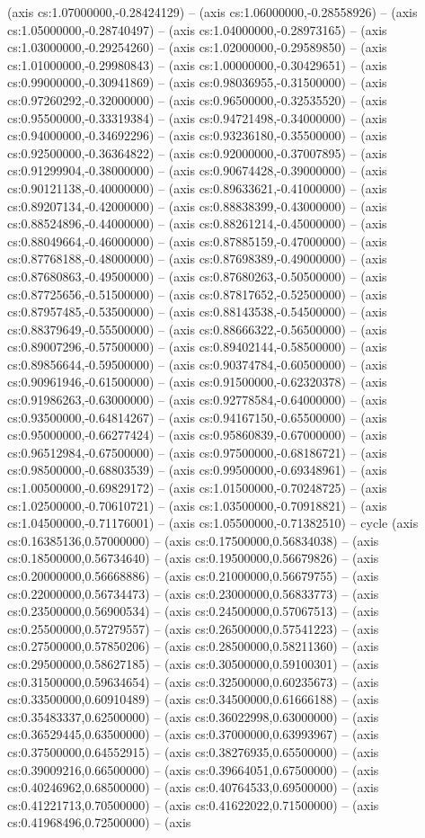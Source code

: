 (axis cs:1.07000000,-0.28424129) -- (axis cs:1.06000000,-0.28558926) -- (axis cs:1.05000000,-0.28740497) -- (axis cs:1.04000000,-0.28973165) -- (axis cs:1.03000000,-0.29254260) -- (axis cs:1.02000000,-0.29589850) -- (axis cs:1.01000000,-0.29980843) -- (axis cs:1.00000000,-0.30429651) -- (axis cs:0.99000000,-0.30941869) -- (axis cs:0.98036955,-0.31500000) -- (axis cs:0.97260292,-0.32000000) -- (axis cs:0.96500000,-0.32535520) -- (axis cs:0.95500000,-0.33319384) -- (axis cs:0.94721498,-0.34000000) -- (axis cs:0.94000000,-0.34692296) -- (axis cs:0.93236180,-0.35500000) -- (axis cs:0.92500000,-0.36364822) -- (axis cs:0.92000000,-0.37007895) -- (axis cs:0.91299904,-0.38000000) -- (axis cs:0.90674428,-0.39000000) -- (axis cs:0.90121138,-0.40000000) -- (axis cs:0.89633621,-0.41000000) -- (axis cs:0.89207134,-0.42000000) -- (axis cs:0.88838399,-0.43000000) -- (axis cs:0.88524896,-0.44000000) -- (axis cs:0.88261214,-0.45000000) -- (axis cs:0.88049664,-0.46000000) -- (axis cs:0.87885159,-0.47000000) -- (axis cs:0.87768188,-0.48000000) -- (axis cs:0.87698389,-0.49000000) -- (axis cs:0.87680863,-0.49500000) -- (axis cs:0.87680263,-0.50500000) -- (axis cs:0.87725656,-0.51500000) -- (axis cs:0.87817652,-0.52500000) -- (axis cs:0.87957485,-0.53500000) -- (axis cs:0.88143538,-0.54500000) -- (axis cs:0.88379649,-0.55500000) -- (axis cs:0.88666322,-0.56500000) -- (axis cs:0.89007296,-0.57500000) -- (axis cs:0.89402144,-0.58500000) -- (axis cs:0.89856644,-0.59500000) -- (axis cs:0.90374784,-0.60500000) -- (axis cs:0.90961946,-0.61500000) -- (axis cs:0.91500000,-0.62320378) -- (axis cs:0.91986263,-0.63000000) -- (axis cs:0.92778584,-0.64000000) -- (axis cs:0.93500000,-0.64814267) -- (axis cs:0.94167150,-0.65500000) -- (axis cs:0.95000000,-0.66277424) -- (axis cs:0.95860839,-0.67000000) -- (axis cs:0.96512984,-0.67500000) -- (axis cs:0.97500000,-0.68186721) -- (axis cs:0.98500000,-0.68803539) -- (axis cs:0.99500000,-0.69348961) -- (axis cs:1.00500000,-0.69829172) -- (axis cs:1.01500000,-0.70248725) -- (axis cs:1.02500000,-0.70610721) -- (axis cs:1.03500000,-0.70918821) -- (axis cs:1.04500000,-0.71176001) -- (axis cs:1.05500000,-0.71382510) -- cycle (axis cs:0.16385136,0.57000000) -- (axis cs:0.17500000,0.56834038) -- (axis cs:0.18500000,0.56734640) -- (axis cs:0.19500000,0.56679826) -- (axis cs:0.20000000,0.56668886) -- (axis cs:0.21000000,0.56679755) -- (axis cs:0.22000000,0.56734473) -- (axis cs:0.23000000,0.56833773) -- (axis cs:0.23500000,0.56900534) -- (axis cs:0.24500000,0.57067513) -- (axis cs:0.25500000,0.57279557) -- (axis cs:0.26500000,0.57541223) -- (axis cs:0.27500000,0.57850206) -- (axis cs:0.28500000,0.58211360) -- (axis cs:0.29500000,0.58627185) -- (axis cs:0.30500000,0.59100301) -- (axis cs:0.31500000,0.59634654) -- (axis cs:0.32500000,0.60235673) -- (axis cs:0.33500000,0.60910489) -- (axis cs:0.34500000,0.61666188) -- (axis cs:0.35483337,0.62500000) -- (axis cs:0.36022998,0.63000000) -- (axis cs:0.36529445,0.63500000) -- (axis cs:0.37000000,0.63993967) -- (axis cs:0.37500000,0.64552915) -- (axis cs:0.38276935,0.65500000) -- (axis cs:0.39009216,0.66500000) -- (axis cs:0.39664051,0.67500000) -- (axis cs:0.40246962,0.68500000) -- (axis cs:0.40764533,0.69500000) -- (axis cs:0.41221713,0.70500000) -- (axis cs:0.41622022,0.71500000) -- (axis cs:0.41968496,0.72500000) -- (axis 